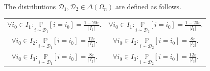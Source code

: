 \documentclass[11pt]{article}
\begin{document}
The distributions $\mathcal{D}_{1}, \mathcal{D}_{2}\in \Delta(\Omega_{n})$ are defined as follows.
\begin{center}
\begin{tabular}{ c c }
 $\forall i_{0} \in I_{1}: \underset{i\sim \mathcal{D}_{1}}{\mathbb{P}}\left [i=i_{0}\right ]=\frac{1-20\varepsilon}{|I_{1}|}.$ & $\forall i_{0} \in I_{1}: \underset{i\sim \mathcal{D}_{2}}{\mathbb{P}}\left [i=i_{0}\right ]=\frac{1-20\varepsilon}{|I_{1}|}.$ \\
 $\forall i_{0} \in I_{2}: \underset{i\sim \mathcal{D}_{1}}{\mathbb{P}}\left [i=i_{0}\right ]=\frac{12\varepsilon}{|I_{2}|}.$ & $\forall i_{0} \in I_{2}: \underset{i\sim \mathcal{D}_{2}}{\mathbb{P}}\left [i=i_{0}\right ]=\frac{8\varepsilon}{|I_{2}|}.$ \\ 
 $\forall i_{0} \in I_{3}: \underset{i\sim \mathcal{D}_{1}}{\mathbb{P}}\left [i=i_{0}\right ]=\frac{8\varepsilon}{|I_{3}|}.$ & $\forall i_{0} \in I_{3}: \underset{i\sim \mathcal{D}_{2}}{\mathbb{P}}\left [i=i_{0}\right ]=\frac{12\varepsilon}{|I_{3}|}.$ 
\end{tabular}
\end{center}
\end{document}

